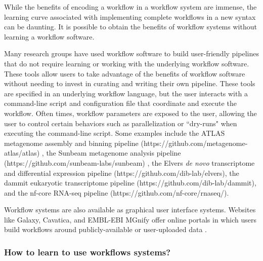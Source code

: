 \documentclass[10pt,letterpaper]{article}
\begin{document}
While the benefits of encoding a workflow in a workflow system are immense, the learning curve associated with implementing complete workflows in a new syntax can be daunting. 
It is possible to obtain the benefits of workflow systems without learning a workflow software.

Many research groups have used workflow software to build user-friendly pipelines that do not require learning or working with the underlying workflow software.
These tools allow users to take advantage of the benefits of workflow software without needing to invest in curating and writing their own pipeline. 
These tools are specified in an underlying workflow language, but the user interacts with a command-line script and configuration file that coordinate and execute the workflow. 
Often times, workflow parameters are exposed to the user, allowing the user to control certain behaviors such as parallelization or ``dry-runs" when executing the command-line script.
Some examples include the ATLAS metagenome assembly and binning pipeline (https://github.com/metagenome-atlas/atlas) \cite{kieser2019atlas}, the Sunbeam metagenome analysis pipeline (https://github.com/sunbeam-labs/sunbeam) \cite{clarke2019sunbeam}, the Elvers \textit{de novo} transcriptome and differential expression pipeline (https://github.com/dib-lab/elvers), the dammit eukaryotic transcriptome pipeline (https://github.com/dib-lab/dammit), and the nf-core RNA-seq pipeline (https://github.com/nf-core/rnaseq/). 

Workflow systems are also available as graphical user interface systems.
Websites like Galaxy, Cavatica, and EMBL-EBI MGnify offer online portals in which users build workflows around publicly-available or user-uploaded data \citep{afgan2018galaxy, volchenboum2017data, mitchell2020mgnify}.

\subsubsection*{How to learn to use workflows systems?}
\end{document}
